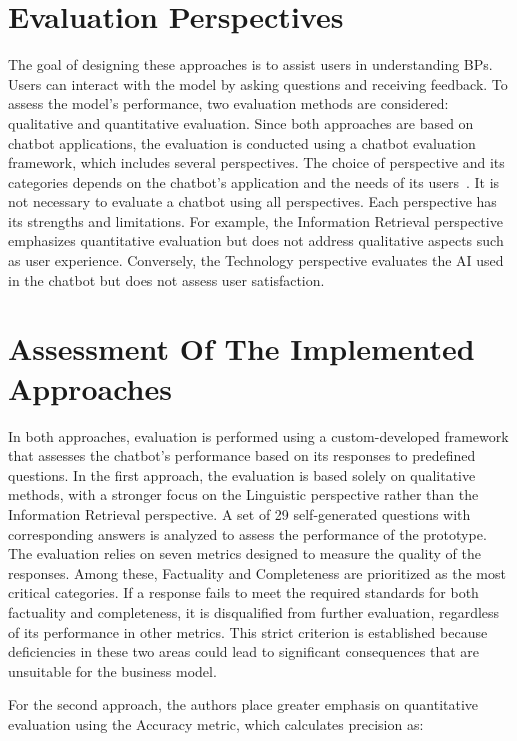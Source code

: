 \documentclass[%
    paper=A4,                    %
    twoside=true,               %
    openright,                  %
    parskip=full,               %
    chapterprefix=true,         %
    11pt,                       %
    headings=normal,            %
    bibliography=totoc,         %
    listof=totoc,              %
    titlepage=on,              %
    captions=tableabove,        %
    draft=false,               %
]{scrreprt}%
\begin{document}
\section{Evaluation Perspectives }

The goal of designing these approaches is to assist users in understanding BPs. Users can interact with the model by asking questions and receiving feedback. To assess the model's performance, two evaluation methods are considered: qualitative and quantitative evaluation.
Since both approaches \cite{franzoi2024using, bernardi2024conversing} are based on chatbot applications, the evaluation is conducted using a chatbot evaluation framework, which includes several perspectives. The choice of perspective and its categories depends on the chatbot’s application and the needs of its users~\cite{peras2018chatbot}. It is not necessary to evaluate a chatbot using all perspectives.
Each perspective has its strengths and limitations. For example, the Information Retrieval perspective emphasizes quantitative evaluation but does not address qualitative aspects such as user experience. Conversely, the Technology perspective evaluates the AI used in the chatbot but does not assess user satisfaction.


\section{Assessment Of The Implemented Approaches}

In both approaches, evaluation is performed using a custom-developed framework that assesses the chatbot's performance based on its responses to predefined questions.
In the first approach, the evaluation is based solely on qualitative methods, with a stronger focus on the Linguistic perspective rather than the Information Retrieval perspective. A set of 29 self-generated questions with corresponding answers is analyzed to assess the performance of the prototype. The evaluation relies on seven metrics designed to measure the quality of the responses. Among these, Factuality and Completeness are prioritized as the most critical categories.
If a response fails to meet the required standards for both factuality and completeness, it is disqualified from further evaluation, regardless of its performance in other metrics. This strict criterion is established because deficiencies in these two areas could lead to significant consequences that are unsuitable for the business model.

For the second approach, the authors place greater emphasis on quantitative evaluation using the Accuracy metric, which calculates precision as:
\end{document}
